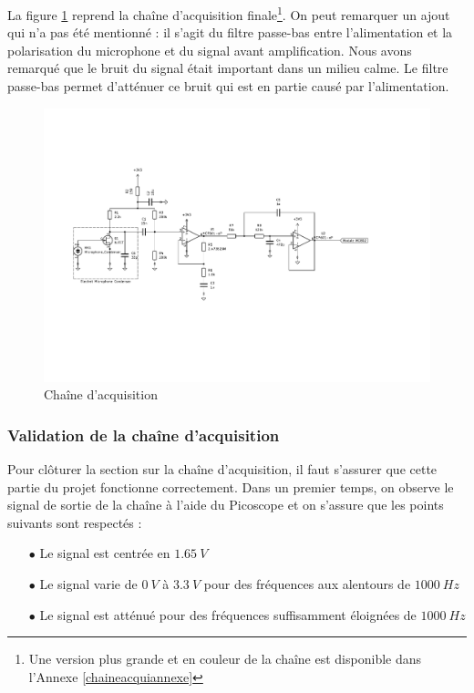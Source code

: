 La figure \ref{fig:chaineacquisition} reprend la chaîne d'acquisition finale\footnote{Une version plus grande et en couleur de la chaîne est disponible dans l'Annexe \ref{chaineacquiannexe}}. On peut remarquer un ajout qui n'a pas été mentionné : il s'agit du filtre passe-bas entre l'alimentation et la polarisation du microphone et du signal avant amplification. Nous avons remarqué que le bruit du signal était important dans un milieu calme. Le filtre passe-bas permet d'atténuer ce bruit qui est en partie causé par l'alimentation.

\begin{figure}[H]
    \centering
    \includegraphics[width=1.2\textwidth]{pdffiles/chainacquiCompacBlack.pdf}
    \caption{Chaîne d'acquisition}
    \label{fig:chaineacquisition}
\end{figure}

\subsubsection{Validation de la chaîne d'acquisition}

Pour clôturer la section sur la chaîne d'acquisition, il faut s'assurer que cette partie du projet fonctionne correctement.
Dans un premier temps, on observe le signal de sortie de la chaîne à l'aide du Picoscope et on s'assure que les points suivants sont respectés :

\begin{itemize}
    \item [$\bullet$] Le signal est centrée en $1.65 \ V$
    \item [$\bullet$] Le signal varie de $0 \ V$ à $3.3 \ V$ pour des fréquences aux alentours de $1000 \ Hz$
    \item [$\bullet$] Le signal est atténué pour des fréquences suffisamment éloignées de $1000 \ Hz$
\end{itemize}

